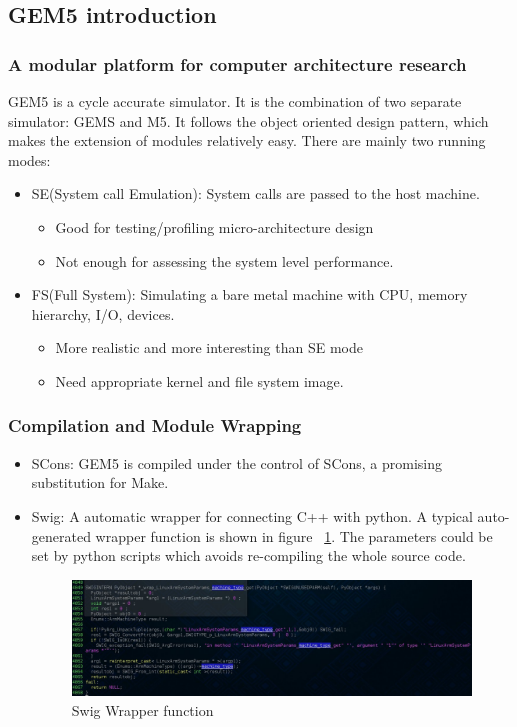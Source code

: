 \documentclass{beamer}
\begin{document}
\subsection{GEM5 introduction}
\begin{frame}
\frametitle{A modular platform for computer architecture research}
GEM5 is a cycle accurate simulator. It is the combination of two separate
simulator: GEMS and M5. It follows the object oriented design pattern, which
makes the extension of modules relatively easy. There are mainly two running
modes:
\begin{itemize}
    \item SE(System call Emulation): System calls are passed to the host
	machine. 
	\begin{itemize}
	    \item Good for testing/profiling micro-architecture design
	    \item Not enough for assessing the system level performance.
	\end{itemize}
    \item FS(Full System): Simulating a bare metal machine with CPU, memory
	hierarchy, I/O, devices. 
	\begin{itemize}
	    \item More realistic and more interesting than SE mode
	    \item Need appropriate kernel and file system image.
	\end{itemize}
\end{itemize}
\end{frame}
\begin{frame}
\frametitle{Compilation and Module Wrapping}

\begin{itemize}
    \item SCons:  GEM5 is compiled under the control of SCons, a promising substitution for Make.
    \item Swig: A automatic wrapper for connecting C++ with python.  A typical
	auto-generated wrapper function is shown in figure ~\ref{fig:swig}.
	The parameters could be set by python scripts which avoids re-compiling the whole source code.
	\begin{figure}[H]
	    \begin{center}
		\includegraphics[scale=0.3]{back6.jpg}
	    \end{center}
	    \caption{Swig Wrapper function}
	    \label{fig:swig}
	\end{figure}
\end{itemize}
\end{frame}
\end{document}
